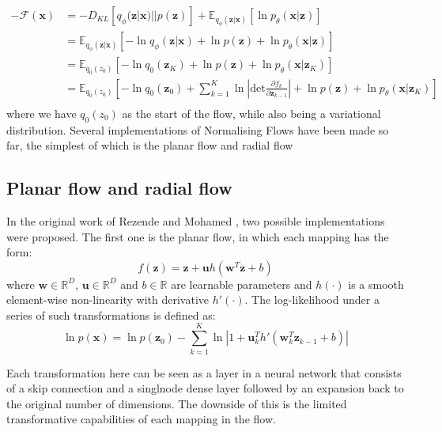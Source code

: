 \documentclass{report}
\newcommand{\E}{\mathbb{E}}
\newcommand{\bu}{\mathbf{u}}
\newcommand{\bw}{\mathbf{w}}
\newcommand{\bx}{\mathbf{x}}
\newcommand{\bz}{\mathbf{z}}
\newcommand{\parfrac}[2]{\frac{\partial #1}{\partial#2}}
\begin{document}
\begin{equation}\label{equation:negative_free_energy_with_flow}
    \begin{split}
    -\mathcal{F}(\bx) &= -D_{KL}[q_\phi(\bz|\bx) || p(\bz)] + \E_{q_\phi(\bz|\bx)}[\ln p_\theta(\bx|\bz)]\\
    &= \E_{q_\phi(\bz|\bx)}[-\ln q_\phi(\bz|\bx) + \ln p(\bz) + \ln p_\theta(\bx|\bz)]\\
    &= \E_{q_0(z_0)}[-\ln q_0(\bz_K) + \ln p(\bz) + \ln p_\theta(\bx|\bz_K)]\\
    &= \E_{q_0(z_0)}[-\ln q_0(\bz_0) + \sum\limits^K_{k=1}\ln \left|\text{det} \parfrac{f_k}{\bz_{k-1}} \right| + \ln p(\bz) + \ln p_\theta(\bx|\bz_K)]\\
    \end{split}
\end{equation}
where we have $q_0(z_0)$ as the start of the flow, while also being a variational distribution. Several implementations of Normalising Flows have been made so far, the simplest of which is the planar flow and radial flow

\subsection{Planar flow and radial flow}\label{section:planar_radial_flow}
In the original work of Rezende and Mohamed \cite{rezende2016variational}, two possible implementations were proposed. The first one is the planar flow, in which each mapping has the form:
\begin{equation}\label{equation:planar_flow}
    f(\bz) = \bz + \bu h(\bw^T\bz + b)
\end{equation}
where $\bw \in \mathbb{R}^D$, $\bu \in \mathbb{R}^D$ and $b \in \mathbb{R}$ are learnable parameters and $h(\cdot)$ is a smooth element-wise non-linearity with derivative $h'(\cdot)$. The log-likelihood under a series of such transformations is defined as:
\begin{equation}\label{equation:planar_flow_logdet}
    \ln p(\bx) = \ln p(\bz_0) - \sum\limits^K_{k=1} \ln \left|1 + \bu_k^T h'(\bw_k^T \bz_{k-1} + b) \right|
\end{equation}

Each transformation here can be seen as a layer in a neural network that consists of a skip connection and a singlnode dense layer followed by an expansion back to the original number of dimensions. The downside of this is the limited transformative capabilities of each mapping in the flow.
\end{document}
